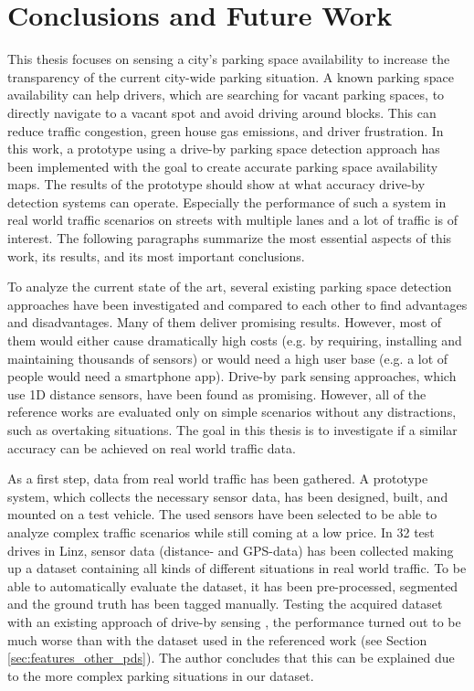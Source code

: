 \chapter{Conclusions and Future Work}
\label{chap:conclusion}



This thesis focuses on sensing a city's parking space availability to increase the transparency of the current city-wide parking situation. 
A known parking space availability can help drivers, which are searching for vacant parking spaces, to directly navigate to a vacant spot and avoid driving around blocks. This can reduce traffic congestion, green house gas emissions, and driver frustration. 
In this work, a prototype using a drive-by parking space detection approach has been implemented with the goal to create accurate parking space availability maps. The results of the prototype should show at what accuracy drive-by detection systems can operate. Especially the performance of such a system in real world traffic scenarios on streets with multiple lanes and a lot of traffic is of interest.
The following paragraphs summarize the most essential aspects of this work, its results, and its most important conclusions.



To analyze the current state of the art, several existing parking space detection approaches have been investigated and compared to each other to find advantages and disadvantages.
Many of them deliver promising results. However, most of them would either cause dramatically high costs (e.g. by requiring, installing and maintaining thousands of sensors) or would need a high user base (e.g. a lot of people would need a smartphone app). 
 Drive-by park sensing approaches, which use 1D distance sensors, have been found as promising. However, all of the reference works are evaluated only on simple scenarios without any distractions, such as overtaking situations. 
The goal in this thesis is to investigate if a similar accuracy can be achieved on real world traffic data.

As a first step, data from real world traffic has been gathered. A prototype system, which collects the necessary sensor data, has been designed, built, and mounted on a test vehicle. The used sensors have been selected to be able to analyze complex traffic scenarios while still coming at a low price. 
In 32 test drives in Linz, sensor data (distance- and GPS-data) has been collected making up a dataset containing all kinds of different situations in real world traffic. To be able to automatically evaluate the dataset, it has been pre-processed, segmented and the ground truth has been tagged manually. 
Testing the acquired dataset with an existing approach of drive-by sensing \cite{Mathur:2010:PDS:1814433.1814448}, the performance turned out to be much worse than with the dataset used in the referenced work (see Section \ref{sec:features_other_pds}). The author concludes that this can be explained due to the more complex parking situations in our dataset. 

